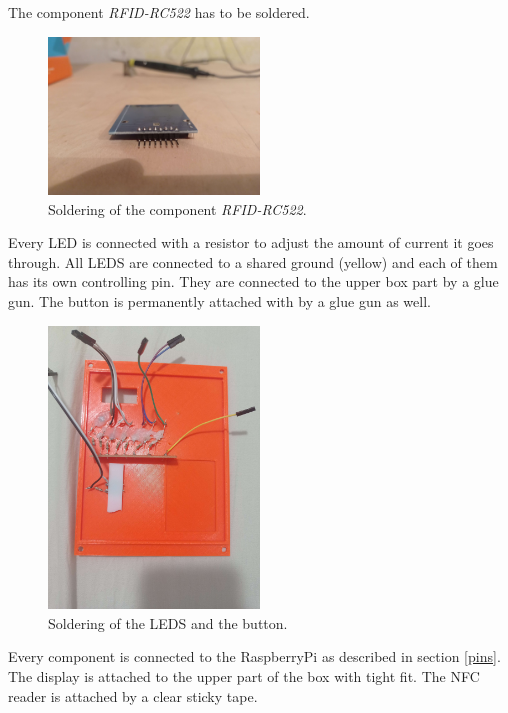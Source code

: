 \documentclass{article}
\begin{document}
    The component \emph{RFID-RC522} has to be soldered. 
\begin{figure}[ht]
    \centering
    \includegraphics[width=0.5\textwidth]{imgs/Soldering1.jpg}
    \caption{Soldering of the component \emph{RFID-RC522}.}
\end{figure}

    Every LED is connected with a resistor to adjust the amount of current it goes through. 
    All LEDS are connected to a shared ground (yellow) and each of them has its own controlling pin.
    They are connected to the upper box part by a glue gun.
    The button is permanently attached with by a glue gun as well.

\begin{figure}[ht]
    \centering
    \includegraphics[width=0.5\textwidth]{imgs/Soldering2.jpg}
    \caption{Soldering of the LEDS and the button.}
\end{figure}

    Every component is connected to the RaspberryPi as described in section \ref{pins}. 
    The display is attached to the upper part of the box with tight fit.
    The NFC reader is attached by a clear sticky tape.
\end{document}
